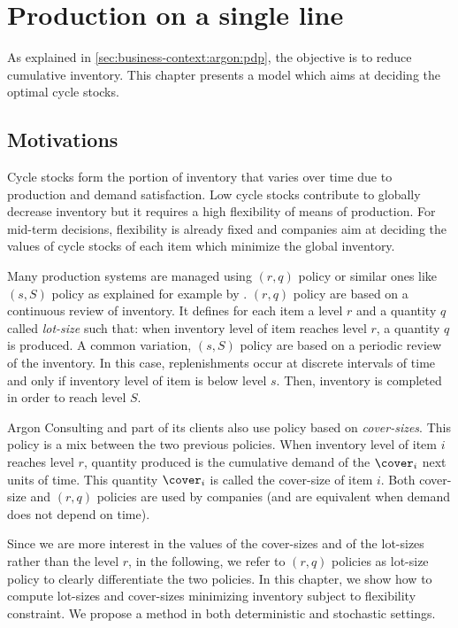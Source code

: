 \chapter{Production on a single line}
\label{chap:lot-size:single-line}


As explained in \cref{sec:business-context:argon:pdp}, the objective is to reduce cumulative inventory.
This chapter presents a model which aims at deciding the optimal cycle stocks.



\section{Motivations}
\label{sec:lot-size:single-line:motivations}

Cycle stocks form the portion of inventory that varies over time due to production and demand satisfaction.
Low cycle stocks contribute to globally decrease inventory but it requires a high flexibility of means of production.
For mid-term decisions, flexibility is already fixed and companies aim at deciding the values of cycle stocks of each item which minimize the global inventory.


Many production systems are managed using $(r,q)$ policy or similar ones like $(s,S)$ policy as explained for example by \citet{Arrow1951}.
$(r,q)$ policy are based on a continuous review of inventory.
It defines for each item a level $r$ and a quantity $q$ called \emph{lot-size} such that: when inventory level of item reaches level $r$, a quantity $q$ is produced.
A common variation, $(s,S)$ policy are based on a periodic review of the inventory.
In this case, replenishments occur at discrete intervals of time and only if inventory level of item is below level $s$.
Then, inventory is completed in order to reach level $S$.


Argon Consulting and part of its clients also use policy based on \emph{cover-sizes}.
This policy is a mix between the two previous policies.
When inventory level of item $i$ reaches level $r$, quantity produced is the cumulative demand of the $\cover_i$ next units of time.
This quantity $\cover_i$ is called the cover-size of item $i$.
Both cover-size and $(r,q)$ policies are used by companies (and are equivalent when demand does not depend on time).


Since we are more interest in the values of the cover-sizes and of the lot-sizes rather than the level $r$, in the following, we refer to $(r,q)$ policies as lot-size policy to clearly differentiate the two policies.
In this chapter, we show how to compute lot-sizes and cover-sizes minimizing inventory subject to flexibility constraint.
We propose a method in both deterministic and stochastic settings.


